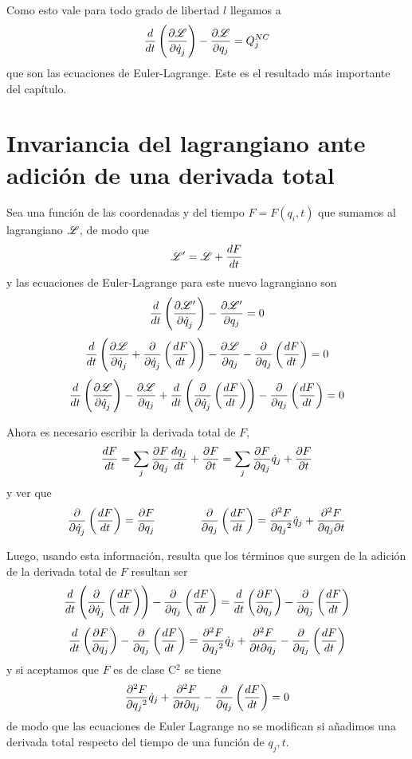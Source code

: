 \documentclass[10pt,oneside]{CBFT_article}
\begin{document}
Como esto vale para todo grado de libertad $l$ llegamos a
\[
\frac{d}{dt} \left( \dpar{\Lag}{\dot{q}_j} \right) -  \dpar{\Lag}{q_j} = Q_j^{NC}
\]
que son las ecuaciones de Euler-Lagrange. Este es el resultado más importante del capítulo.

\section{Invariancia del lagrangiano ante adición de una derivada total}

Sea una función de las coordenadas y del tiempo $F=F(q_i,t)$ que sumamos al lagrangiano $\Lag$, de modo que
\[
\Lag'=\Lag + \dtot{F}{t} 
\]
y las ecuaciones de Euler-Lagrange para este nuevo lagrangiano son
\[
\frac{d}{dt}\left(\dpar{\Lag'}{\dot{q}_j}\right) - \dpar{\Lag'}{q_j} = 0
\]
\[
\dtot{}{t}\left(\dpar{\Lag}{\dot{q}_j} + \dpar{}{\dot{q}_j}\left(\dtot{F}{t}\right)\right) -
\dpar{\Lag}{q_j} - \dpar{}{q_j}\left( \dtot{F}{t}\right) = 0 
\]
\[
\dtot{}{t}\left(\dpar{\Lag}{\dot{q}_j}\right) - \dpar{\Lag}{q_j} + 
\dtot{}{t}\left(\dpar{}{\dot{q}_j}\left(\dtot{F}{t}\right)\right) 
- \dpar{}{q_j}\left( \dtot{F}{t}\right) = 0 
\]

Ahora es necesario escribir la derivada total de $F$,
\[
\dtot{F}{t} = 	\sum_j \dpar{F}{q_j}\dtot{q_j}{t} + \dpar{F}{t} =
			\sum_j \dpar{F}{q_j}\dot{q}_j + \dpar{F}{t}
\]
y ver que
\[
\dpar{}{\dot{q}_j}\left(\dtot{F}{t}\right) = \dpar{F}{q_j} \qquad\qquad
\dpar{}{q_j}\left(\dtot{F}{t}\right) = \dpar[2]{F}{q_j} \dot{q}_j + \dparcru{F}{t}{q_j} 
\]

Luego, usando esta información, resulta que los términos que surgen de la adición de la derivada total de $F$ resultan 
ser
\[
\dtot{}{t}\left( \dpar{}{\dot{q}_j}\left(\dtot{F}{t}\right)\right) - \dpar{}{q_j}\left( \dtot{F}{t}\right) = 
\dtot{}{t}\left( \dpar{F}{q_j} \right) - \dpar{}{q_j}\left( \dtot{F}{t}\right)
\]
\[
\dtot{}{t}\left( \dpar{F}{q_j} \right) - \dpar{}{q_j}\left( \dtot{F}{t}\right) =
\dpar[2]{F}{q_j} \dot{q}_j + \dparcru{F}{q_j}{t} - \dpar{}{q_j}\left( \dtot{F}{t}\right)
\]
y si aceptamos que $F$ es de clase C$^2$ se tiene
\[
\dpar[2]{F}{q_j} \dot{q}_j + \dparcru{F}{q_j}{t} - \dpar{}{q_j}\left( \dtot{F}{t}\right)=0
\]
de modo que las ecuaciones de Euler Lagrange no se modifican si añadimos una derivada total respecto del tiempo de una 
función de $q_j,t$.
\end{document}
